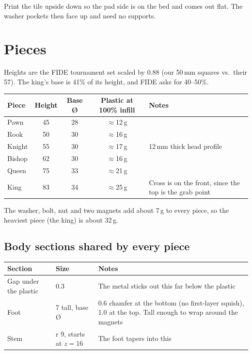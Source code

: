 \documentclass[10pt]{article}
\newcommand{\mm}{\,mm}
\begin{document}
Print the tile upside down so the pad side is on the bed and comes out flat. The washer pockets
then face up and need no supports.

\section{Pieces}

Heights are the FIDE tournament set scaled by 0.88 (our 50\mm{} squares vs.\ their 57).
The king's base is 41\% of its height, and FIDE asks for 40--50\%.

\begin{tabularx}{\textwidth}{l c c c L}
\toprule
Piece & Height & Base \O & Plastic at 100\% infill & Notes \\
\midrule
Pawn   & 45 & 28 & $\approx$12\,g & \\
Rook   & 50 & 30 & $\approx$16\,g & \\
Knight & 55 & 30 & $\approx$17\,g & 12\mm{} thick head profile \\
Bishop & 62 & 30 & $\approx$16\,g & \\
Queen  & 75 & 33 & $\approx$21\,g & \\
King   & 83 & 34 & $\approx$25\,g & Cross is on the front, since the top is the grab point \\
\bottomrule
\end{tabularx}

The washer, bolt, nut and two magnets add about 7\,g to every piece, so the heaviest piece (the king) is about 32\,g.

\subsection{Body sections shared by every piece}

\begin{tabularx}{\textwidth}{l l L}
\toprule
Section & Size & Notes \\
\midrule
Gap under the plastic & 0.3 & The metal sticks out this far below the plastic \\
Foot & 7 tall, base \O{} & 0.6 chamfer at the bottom (no first-layer squish), 1.0 at the top. Tall enough to wrap around the magnets \\
Stem & r 9, starts at $z = 16$ & The foot tapers into this \\
\bottomrule
\end{tabularx}
\end{document}
